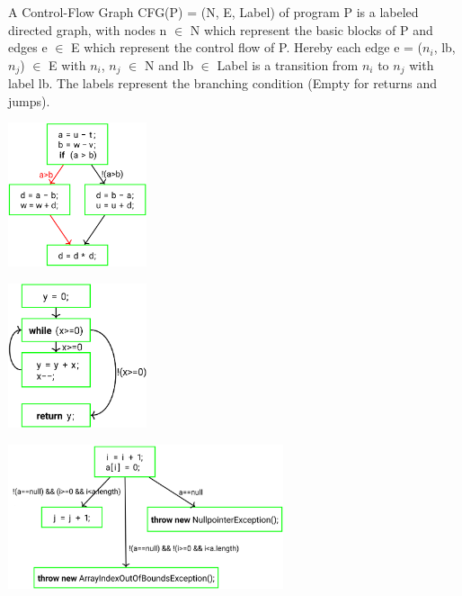 \documentclass[
../../Software_Engineering_Summary.tex,
]
{subfiles}
\begin{document}
\begin{defbox}
    A Control-Flow Graph CFG(P) = (N, E, Label) of program P is a labeled directed graph, with nodes n $\in$ N which represent the basic blocks of P and edges e $\in$ E which represent the control flow of P. 
    Hereby each edge e = ($n_i$, lb, $n_j$) $\in$ E with $n_i$, $n_j$ $\in$ N and lb $\in$ Label is a transition from $n_i$ to $n_j$ with label lb.
    The labels represent the branching condition (Empty for returns and jumps).

    \begin{minipage}
        [t]{0.25\textwidth}
        \includegraphics[height=120pt]{Pics/ExampleCFG.png}
    \end{minipage}
    \hfill
    \begin{minipage}
        [t]{0.25\textwidth}
        \includegraphics[height=120pt]{Pics/ExampleCFGLoop.png}
    \end{minipage}
    \hfill
    \begin{minipage}
        [t]{0.48\textwidth}
        \includegraphics[height=120pt]{Pics/ExampleCFGExceptions.png}
    \end{minipage}
\end{defbox}
\end{document}
